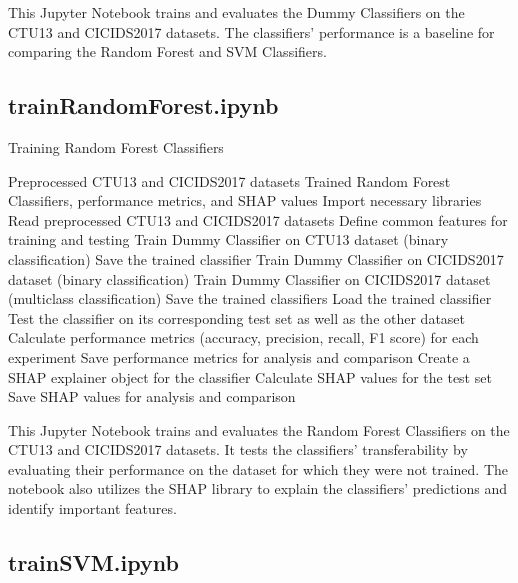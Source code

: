 This Jupyter Notebook trains and evaluates the Dummy Classifiers on the CTU13 and CICIDS2017 datasets. The classifiers' performance is a baseline for comparing the Random Forest and SVM Classifiers.

\subsection{trainRandomForest.ipynb}\label{subsec:trainRandomForest.ipynb}

\begin{algorithm}[H]
\caption{Training Random Forest Classifiers}\label{alg:trainRandomForest}
\begin{algorithmic}[1]
\Require%
Preprocessed CTU13 and CICIDS2017 datasets
\Ensure%
Trained Random Forest Classifiers, performance metrics, and SHAP values
\State%
Import necessary libraries
\State%
Read preprocessed CTU13 and CICIDS2017 datasets
\State%
Define common features for training and testing
        \State%
        Train Dummy Classifier on CTU13 dataset (binary classification)
        \State%
        Save the trained classifier
        \State%
        Train Dummy Classifier on CICIDS2017 dataset (binary classification)
        \State%
        Train Dummy Classifier on CICIDS2017 dataset (multiclass classification)
        \State%
        Save the trained classifiers
    \EndIf%
\EndFor%
    \State%
    Load the trained classifier
    \State%
    Test the classifier on its corresponding test set as well as the other dataset
    \State%
    Calculate performance metrics (accuracy, precision, recall, F1 score) for each experiment
    \State%
    Save performance metrics for analysis and comparison
    \State%
    Create a SHAP explainer object for the classifier
    \State%
    Calculate SHAP values for the test set
    \State%
    Save SHAP values for analysis and comparison
\EndFor%
\end{algorithmic}
\end{algorithm}

This Jupyter Notebook trains and evaluates the Random Forest Classifiers on the CTU13 and CICIDS2017 datasets. It tests the classifiers' transferability by evaluating their performance on the dataset for which they were not trained. The notebook also utilizes the SHAP library to explain the classifiers' predictions and identify important features.

\subsection{trainSVM.ipynb}\label{subsec:trainSVM.ipynb}

